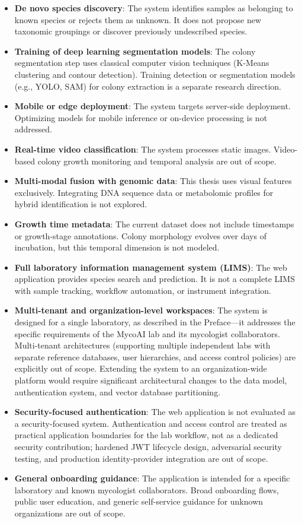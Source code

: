 \begin{itemize}
\item
  \textbf{De novo species discovery}: The system identifies samples as belonging to known species or rejects them as unknown. It does not propose new taxonomic groupings or discover previously undescribed species.
\item
  \textbf{Training of deep learning segmentation models}: The colony segmentation step uses classical computer vision techniques (K-Means clustering and contour detection). Training detection or segmentation models (e.g., YOLO, SAM) for colony extraction is a separate research direction.
\item
  \textbf{Mobile or edge deployment}: The system targets server-side deployment. Optimizing models for mobile inference or on-device processing is not addressed.
\item
  \textbf{Real-time video classification}: The system processes static images. Video-based colony growth monitoring and temporal analysis are out of scope.
\item
  \textbf{Multi-modal fusion with genomic data}: This thesis uses visual features exclusively. Integrating DNA sequence data or metabolomic profiles for hybrid identification is not explored.
\item
  \textbf{Growth time metadata}: The current dataset does not include timestamps or growth-stage annotations. Colony morphology evolves over days of incubation, but this temporal dimension is not modeled.
\item
  \textbf{Full laboratory information management system (LIMS)}: The web application provides species search and prediction. It is not a complete LIMS with sample tracking, workflow automation, or instrument integration.
\item
  \textbf{Multi-tenant and organization-level workspaces}: The system is designed for a single laboratory, as described in the Preface---it addresses the specific requirements of the MycoAI lab and its mycologist collaborators. Multi-tenant architectures (supporting multiple independent labs with separate reference databases, user hierarchies, and access control policies) are explicitly out of scope. Extending the system to an organization-wide platform would require significant architectural changes to the data model, authentication system, and vector database partitioning.
\item
  \textbf{Security-focused authentication}: The web application is not evaluated as a security-focused system. Authentication and access control are treated as practical application boundaries for the lab workflow, not as a dedicated security contribution; hardened JWT lifecycle design, adversarial security testing, and production identity-provider integration are out of scope.
\item
  \textbf{General onboarding guidance}: The application is intended for a specific laboratory and known mycologist collaborators. Broad onboarding flows, public user education, and generic self-service guidance for unknown organizations are out of scope.
\end{itemize}

